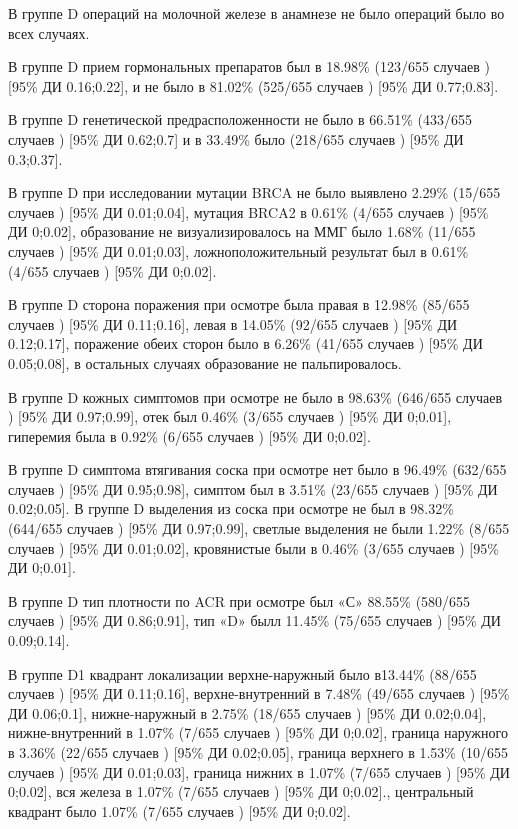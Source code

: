 \documentclass[
]{article}
\begin{document}
В группе D операций на молочной железе в анамнезе не было операций было
во всех случаях.

В группе D прием гормональных препаратов был в 18.98\% (123/655 случаев
) {[}95\% ДИ 0.16;0.22{]}, и не было в 81.02\% (525/655 случаев )
{[}95\% ДИ 0.77;0.83{]}.

В группе D генетической предрасположенности не было в 66.51\% (433/655
случаев ) {[}95\% ДИ 0.62;0.7{]} и в 33.49\% было (218/655 случаев )
{[}95\% ДИ 0.3;0.37{]}.

В группе D при исследовании мутации BRCA не было выявлено 2.29\% (15/655
случаев ) {[}95\% ДИ 0.01;0.04{]}, мутация BRCA2 в 0.61\% (4/655 случаев
) {[}95\% ДИ 0;0.02{]}, образование не визуализировалось на ММГ было
1.68\% (11/655 случаев ) {[}95\% ДИ 0.01;0.03{]}, ложноположительный
результат был в 0.61\% (4/655 случаев ) {[}95\% ДИ 0;0.02{]}.

В группе D сторона поражения при осмотре была правая в 12.98\% (85/655
случаев ) {[}95\% ДИ 0.11;0.16{]}, левая в 14.05\% (92/655 случаев )
{[}95\% ДИ 0.12;0.17{]}, поражение обеих сторон было в 6.26\% (41/655
случаев ) {[}95\% ДИ 0.05;0.08{]}, в остальных случаях образование не
пальпировалось.

В группе D кожных симптомов при осмотре не было в 98.63\% (646/655
случаев ) {[}95\% ДИ 0.97;0.99{]}, отек был 0.46\% (3/655 случаев )
{[}95\% ДИ 0;0.01{]}, гиперемия была в 0.92\% (6/655 случаев ) {[}95\%
ДИ 0;0.02{]}.

В группе D симптома втягивания соска при осмотре нет было в 96.49\%
(632/655 случаев ) {[}95\% ДИ 0.95;0.98{]}, симптом был в 3.51\% (23/655
случаев ) {[}95\% ДИ 0.02;0.05{]}. В группе D выделения из соска при
осмотре не был в 98.32\% (644/655 случаев ) {[}95\% ДИ 0.97;0.99{]},
светлые выделения не были 1.22\% (8/655 случаев ) {[}95\% ДИ
0.01;0.02{]}, кровянистые были в 0.46\% (3/655 случаев ) {[}95\% ДИ
0;0.01{]}.

В группе D тип плотности по ACR при осмотре был «С» 88.55\% (580/655
случаев ) {[}95\% ДИ 0.86;0.91{]}, тип «D» былл 11.45\% (75/655 случаев
) {[}95\% ДИ 0.09;0.14{]}.

В группе D1 квадрант локализации верхне-наружный было в13.44\% (88/655
случаев ) {[}95\% ДИ 0.11;0.16{]}, верхне-внутренний в 7.48\% (49/655
случаев ) {[}95\% ДИ 0.06;0.1{]}, нижне-наружный в 2.75\% (18/655
случаев ) {[}95\% ДИ 0.02;0.04{]}, нижне-внутренний в 1.07\% (7/655
случаев ) {[}95\% ДИ 0;0.02{]}, граница наружного в 3.36\% (22/655
случаев ) {[}95\% ДИ 0.02;0.05{]}, граница верхнего в 1.53\% (10/655
случаев ) {[}95\% ДИ 0.01;0.03{]}, граница нижних в 1.07\% (7/655
случаев ) {[}95\% ДИ 0;0.02{]}, вся железа в 1.07\% (7/655 случаев )
{[}95\% ДИ 0;0.02{]}., центральный квадрант было 1.07\% (7/655 случаев )
{[}95\% ДИ 0;0.02{]}.
\end{document}
